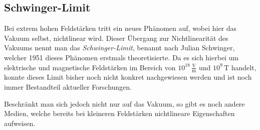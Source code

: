 

\subsection{Schwinger-Limit}\label{particles:section:lin-medium:schwinger}
Bei extrem hohen Feldstärken tritt ein neues Phänomen auf, 
wobei hier das Vakuum selbst, nichtlinear wird.
Dieser Übergang zur Nichtlinearität des Vakuums nennt man das \emph{Schwinger-Limit}, 
benannt nach Julian Schwinger, welcher 1951 dieses Phänomen erstmals theoretisierte.
Da es sich hierbei um elektrische und magnetische Feldstärken im Bereich von $10^{18}\,\frac{\text{V}}{\text{m}}$ und $10^9\,\text{T}$ handelt,
konnte dieses Limit bisher noch nicht konkret nachgewiesen werden und ist noch immer Bestandteil aktueller Forschungen. 

Beschränkt man sich jedoch nicht nur auf das Vakuum, 
so gibt es noch andere Medien, welche bereits bei kleineren Feldstärken nichtlineare Eigenschaften aufweisen.




